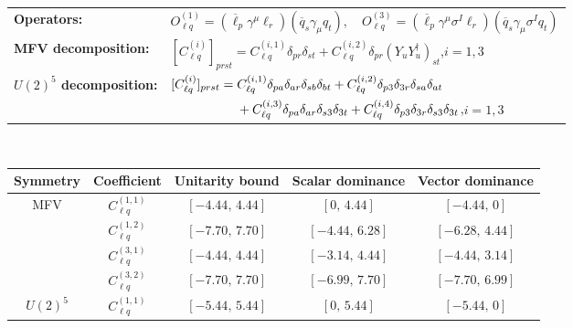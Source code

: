 \begin{table}[htbp]
\centering
{\small
\begin{tabular}{ll}
    \textbf{Operators:} &
        $\boxed{O_{\ell q}^{(1)} = (\overline\ell_p \gamma^\mu \ell_r)(\overline q_s \gamma_\mu q_t),\quad O_{\ell q}^{(3)} = (\overline\ell_p \gamma^\mu \sigma^I \ell_r)(\overline q_s \gamma_\mu \sigma^I q_t)}$ \\[0.2cm]
    \textbf{MFV decomposition:} &
        $[C_{\ell q}^{(i)}]_{prst} =
            C_{\ell q}^{(i,1)}\delta_{pr}\delta_{st}
            + C_{\ell q}^{(i,2)}\delta_{pr}(Y_u Y_u^\dagger)_{st}$,\quad $i=1,3$ \\[0.15cm]
    \textbf{$U(2)^5$ decomposition:} &
        $[C_{\ell q}^{(i)}]_{prst} =
            C_{\ell q}^{(i,1)}\Pij{p}{r}{a}\Pij{s}{t}{b}
            + C_{\ell q}^{(i,2)}\delta_{p3}\delta_{3r}\Pij{s}{t}{a}
            $ \\
        & $\phantom{[C_{\ell q}^{(i)}]_{prst} ={}}+ C_{\ell q}^{(i,3)}\Pij{p}{r}{a}\delta_{s3}\delta_{3t}
            + C_{\ell q}^{(i,4)}\delta_{p3}\delta_{3r}\delta_{s3}\delta_{3t}$,\quad $i=1,3$ \\
\end{tabular}
\\[0.3cm]
\renewcommand{\arraystretch}{1.3}
\begin{tabular}{ccccc}
    \toprule
    \rowcolor{hdrcolor}
    \textbf{Symmetry} & \textbf{Coefficient}
        & \textbf{Unitarity bound}
        & \textbf{Scalar dominance}
        & \textbf{Vector dominance} \\
    \midrule
    \multirow{4}{*}{MFV}
        & $C_{\ell q}^{(1,1)}$ & $[-4.44,\, 4.44]$ & $[0,\, 4.44]$      & $[-4.44,\, 0]$    \\
        & $C_{\ell q}^{(1,2)}$ & $[-7.70,\, 7.70]$ & $[-4.44,\, 6.28]$  & $[-6.28,\, 4.44]$ \\
        & $C_{\ell q}^{(3,1)}$ & $[-4.44,\, 4.44]$ & $[-3.14,\, 4.44]$  & $[-4.44,\, 3.14]$ \\
        & $C_{\ell q}^{(3,2)}$ & $[-7.70,\, 7.70]$ & $[-6.99,\, 7.70]$  & $[-7.70,\, 6.99]$ \\
    \midrule
    \multirow{8}{*}{$U(2)^5$}
        & $C_{\ell q}^{(1,1)}$ & $[-5.44,\, 5.44]$ & $[0,\, 5.44]$      & $[-5.44,\, 0]$    \\

\end{tabular}}
\end{table}
